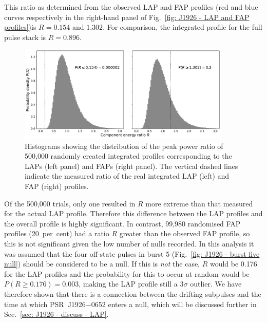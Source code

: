 This ratio as determined from the observed LAP and FAP profiles (red and blue curves respectively in the right-hand panel of Fig.~\ref{fig: J1926 - LAP and FAP profiles})is $R=0.154$ and $1.302$.  For comparison, the integrated profile for the full pulse stack is $R = 0.896$.
\begin{figure}
    \begin{center}
        \includegraphics[width=0.9\textwidth]{Figures/J1926/LAPFAP_histograms}
        \caption[Calculating the significance of the LAP and FAP profiles]{Histograms showing the distribution of the peak power ratio of 500,000 randomly created integrated profiles corresponding to the LAPs (left panel) and FAPs (right panel). The vertical dashed lines indicate the measured ratio of the real integrated LAP (left) and FAP (right) profiles.}
        \label{fig: J1926 - LAP and FAP histograms}
    \end{center}
\end{figure}
Of the 500,000 trials, only one resulted in $R$ more extreme than that measured for the actual LAP profile. Therefore this difference between the LAP profiles and the overall profile is highly significant. In contrast, 99,980 randomised FAP profiles (20~per~cent) had a ratio $R$ greater than the observed FAP profile, so this is not significant given the low number of nulls recorded.
In this analysis it was assumed that the four off-state pulses in burst 5 (Fig.~\ref{fig: J1926 - burst five null}) should be considered to be a null. If this is \textit{not} the case, $R$ would be 0.176 for the LAP profiles and the probability for this to occur at random would be $P(R\geq 0.176) = 0.003$, making the LAP profile still a $3\sigma$ outlier. We have therefore shown that there is a connection between the drifting subpulses and the time at which PSR~J1926$-$0652 enters a null, which will be discussed further in Sec.~\ref{sec: J1926 - discuss - LAP}.



















